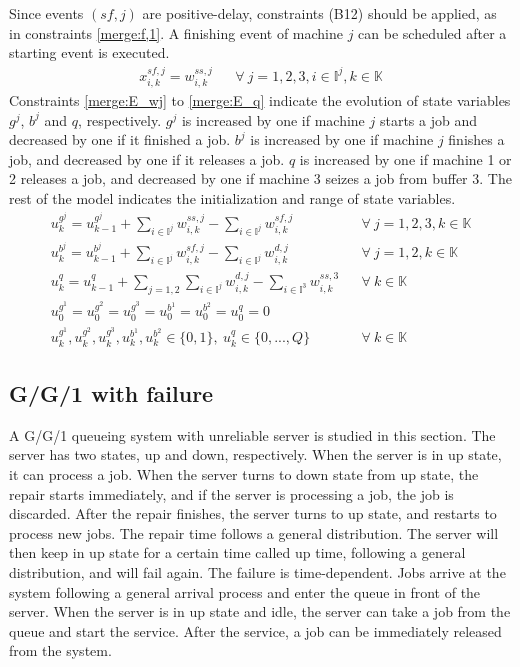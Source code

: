 \documentclass[]{interact}
\theoremstyle{plain}%
\theoremstyle{definition}
\theoremstyle{remark}
\begin{document}
Since events ${(sf,j)}$ are positive-delay, constraints (B12) should be applied, as in constraints \eqref{merge:f,1}. A finishing event of machine $j$ can be scheduled after a starting event is executed. 
\begin{eqnarray}
x^{sf,j}_{i,k} = w^{ss,j}_{i,k} && \forall\ j=1,2,3, i\in \mathbb{I}^{j},k\in \mathbb{K}\label{merge:f,1}
\end{eqnarray}
Constraints \eqref{merge:E_wj} to \eqref{merge:E_q} indicate the evolution of state variables $g^j$, $b^j$ and $q$, respectively. $g^j$ is increased by one if machine $j$ starts a job and decreased by one if it finished a job. $b^j$ is increased by one if machine $j$ finishes a job, and decreased by one if it releases a job. $q$ is increased by one if machine 1 or 2 releases a job, and decreased by one if machine 3 seizes a job from buffer 3. The rest of the model indicates the initialization and range of state variables.
\begin{eqnarray}
u^{g^j}_k=u^{g^j}_{k-1}+ \sum_{i\in\mathbb{I}^j}w^{ss,j}_{i,k}-\sum_{i\in\mathbb{I}^j}w^{sf,j}_{i,k}&& \forall\ j=1,2,3, k\in \mathbb{K}\label{merge:E_wj}\\
u^{b^j}_k=u^{b^j}_{k-1}+ \sum_{i\in\mathbb{I}^j}w^{sf,j}_{i,k}-\sum_{i\in\mathbb{I}^j}w^{d,j}_{i,k}&& \forall\ j=1,2, k\in \mathbb{K}\label{merge:E_bj}\\
u^{q}_k=u^{q}_{k-1}+\sum_{j=1,2}\sum_{i\in\mathbb{I}^j}w^{d,j}_{i,k}-\sum_{i\in\mathbb{I}^3}w^{ss,3}_{i,k}&& \forall\ k\in \mathbb{K}\label{merge:E_q}\\
u^{g^1}_0=u^{g^2}_0=u^{g^3}_0=u^{b^1}_0=u^{b^2}_0=u^{q}_0=0\nonumber\\
u^{g^1}_{k},u^{g^2}_{k},u^{g^3}_{k},u^{b^1}_{k},u^{b^2}_{k}\in\{0,1\},\ u^q_{k}\in\{0,...,Q\}&& \forall\ k\in \mathbb{K}\nonumber
\end{eqnarray}


\subsection{G/G/1 with failure}
A G/G/1 queueing system with unreliable server is studied in this section. The server has two states, up and down, respectively. When the server is in up state, it can process a job. When the server turns to down state from up state, the repair starts immediately, and if the server is processing a job, the job is discarded. After the repair finishes, the server turns to up state, and restarts to process new jobs. The repair time follows a general distribution. The server will then keep in up state for a certain time called up time, following a general distribution, and will fail again. The failure is time-dependent. Jobs arrive at the system following a general arrival process and enter the queue in front of the server. When the server is in up state and idle, the server can take a job from the queue and start the service. After the service, a job can be immediately released from the system.
\end{document}
